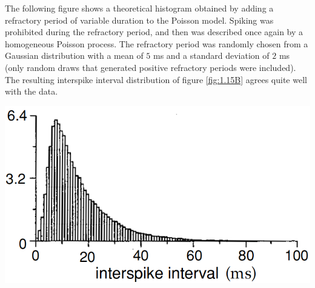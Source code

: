 \begin{exm}
    The following figure shows a theoretical histogram obtained by adding a refractory period of variable duration to the Poisson model. Spiking was prohibited during the refractory period,  and then was described once again by a homogeneous Poisson process. The refractory period was randomly chosen from a Gaussian distribution with a mean of $5$ ms and a standard
deviation of $2$ ms (only random draws that generated positive refractory periods were included). The resulting interspike interval distribution of figure \ref{fig:1.15B} agrees quite well with the data.
\end{exm}

\begin{center}
    \label{fig:1.15B}    
    \includegraphics[scale = 0.27]{png/Figure1-15-B.png}\\
\end{center}

